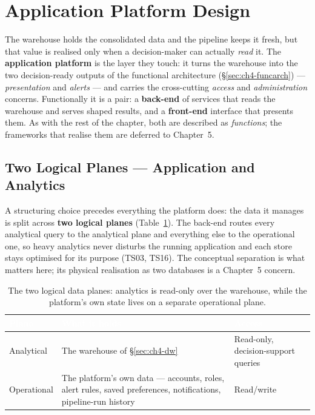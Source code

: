 \section{Application Platform Design}
\label{sec:ch4-app}

The warehouse holds the consolidated data and the pipeline keeps it fresh, but that value is realised
only when a decision-maker can actually \emph{read} it. The \textbf{application platform} is the layer
they touch: it turns the warehouse into the two decision-ready outputs of the functional architecture
(\S\ref{sec:ch4-funcarch}) --- \emph{presentation} and \emph{alerts} --- and carries the cross-cutting
\emph{access} and \emph{administration} concerns. Functionally it is a pair: a \textbf{back-end} of
services that reads the warehouse and serves shaped results, and a \textbf{front-end} interface that
presents them. As with the rest of the chapter, both are described as \emph{functions}; the frameworks
that realise them are deferred to Chapter~5.

\subsection{Two Logical Planes --- Application and Analytics}

A structuring choice precedes everything the platform does: the data it manages is split across
\textbf{two logical planes} (Table~\ref{tab:ch4-app-planes}). The back-end routes every analytical query
to the analytical plane and everything else to the operational one, so heavy analytics never disturbs
the running application and each store stays optimised for its purpose (TS03, TS16). The conceptual
separation is what matters here; its physical realisation as two databases is a Chapter~5 concern.

\begin{table}[H]
\centering
\caption{The two logical data planes: analytics is read-only over the warehouse, while the platform's own
state lives on a separate operational plane.}
\label{tab:ch4-app-planes}
\renewcommand{\arraystretch}{1.3}
\begin{tabularx}{\linewidth}{|>{\raggedright\arraybackslash}p{2.7cm}|>{\raggedright\arraybackslash}X|>{\raggedright\arraybackslash}p{3.4cm}|}
\hline
\rowcolor{tblheader}
\textcolor{white}{\textbf{Plane}} & \textcolor{white}{\textbf{What it holds}} &
\textcolor{white}{\textbf{Access}} \\
\hline
Analytical & The warehouse of \S\ref{sec:ch4-dw} & Read-only, decision-support queries \\
Operational & The platform's own data --- accounts, roles, alert rules, saved preferences,
notifications, pipeline-run history & Read/write \\
\hline
\end{tabularx}
\end{table}

